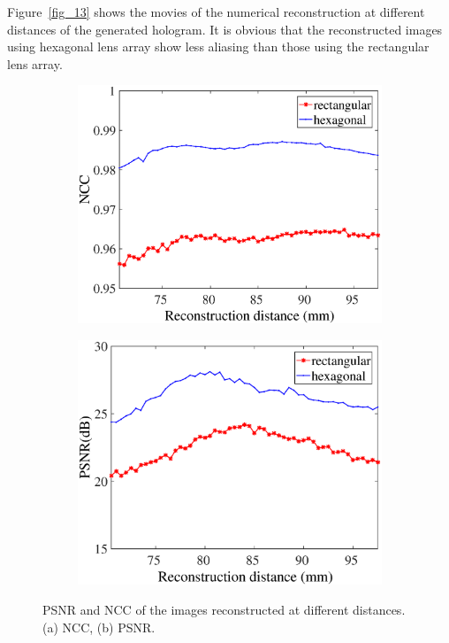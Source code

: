 \documentclass[10pt,letterpaper]{article}
\begin{document}
Figure~\ref{fig_13} shows the movies of the numerical reconstruction at different distances of the generated hologram. It is obvious that the reconstructed images using hexagonal lens array show less aliasing than those using the rectangular lens array.
\begin{figure}[!htb]
 \centering
	\captionsetup[subfigure]{justification=centering}
	\begin{subfigure}[b]{0.45\linewidth}
	\centering
	\includegraphics[width=1\columnwidth]{fig14_a}
	\caption{}
	\end{subfigure}
	\begin{subfigure}[b]{0.45\linewidth}
	\includegraphics[width=1\columnwidth]{fig14_b}
	\centering
	\caption{}
	\end{subfigure}
\caption{PSNR and NCC of the images reconstructed at different distances. (a) NCC, (b) PSNR. 
}
\label{fig_14}
\end{figure}
\end{document}
